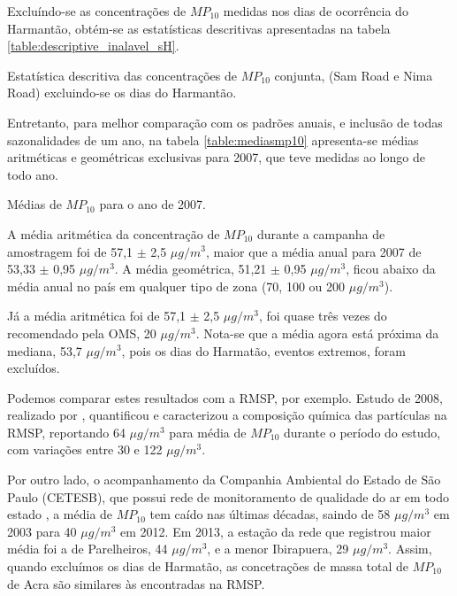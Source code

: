Excluíndo-se as concentrações de $MP_{10}$ medidas nos dias de ocorrência do 
Harmantão, obtém-se as estatísticas descritivas apresentadas na tabela 
\ref{table:descriptive_inalavel_sH}.

\begin{table}[H]
  \centering
    
  \caption{Estatística descritiva das concentrações de $MP_{10}$ conjunta, 
           (Sam Road e Nima Road) excluindo-se os dias do Harmantão.
            \label{table:descriptive_inalavel_sH}}
\end{table}

Entretanto, para melhor comparação com os padrões anuais, e inclusão de todas 
sazonalidades de um ano, na tabela \ref{table:mediasmp10} apresenta-se médias 
aritméticas e geométricas exclusivas para 2007, que teve medidas ao longo de 
todo ano.

\begin{table}[H]
  \centering
  
  \caption{Médias de $MP_{10}$ para o ano de 2007. \label{table:mediasmp10}}
\end{table}

A média aritmética da concentração de $MP_{10}$ durante a campanha de amostragem 
foi de 57,1 $\pm$ 2,5 $\mu g/ m^3$, maior que a média anual para 2007 de 
53,33 $\pm$ 0,95 $\mu g/ m^3$. A média geométrica, 51,21 $\pm$ 0,95 $\mu g/ m^3$, 
ficou abaixo da média anual no país em qualquer tipo de zona 
(70, 100 ou 200 $\mu g/ m^3$). 

Já a média aritmética foi de 57,1 $\pm$ 2,5 $\mu g/ m^3$, foi quase três vezes 
do recomendado pela OMS, 20 $\mu g/m^3$. Nota-se que a média agora está próxima
da mediana, 53,7 $\mu g/ m^3$, pois os dias do Harmatão, eventos extremos, 
foram excluídos. 

Podemos comparar estes resultados com a RMSP, por exemplo. Estudo de 2008, 
realizado por \citet{souza2014}, quantificou e caracterizou a composição química
das partículas na RMSP, reportando 64 $\mu g / m^3$ para média de $MP_{10}$ 
durante o período do estudo, com variações entre 30 e 122 $\mu g / m^3$.

Por outro lado, o acompanhamento da Companhia Ambiental do Estado de São Paulo 
(CETESB), que possui rede de monitoramento de qualidade do ar em todo estado 
\citep{cetesb2014}, a média de $MP_{10}$ tem caído nas últimas décadas, saindo 
de 58 $\mu g / m^3$ em 2003 para 40 $\mu g / m^3$ em 2012. Em 2013, a estação da
rede que registrou maior média foi a de Parelheiros, 44 $\mu g / m^3$, e a menor 
Ibirapuera, 29 $\mu g / m^3$. Assim, quando excluímos os dias de Harmatão, 
as concetrações de massa total de $MP_{10}$ de Acra são similares às encontradas
na RMSP.

